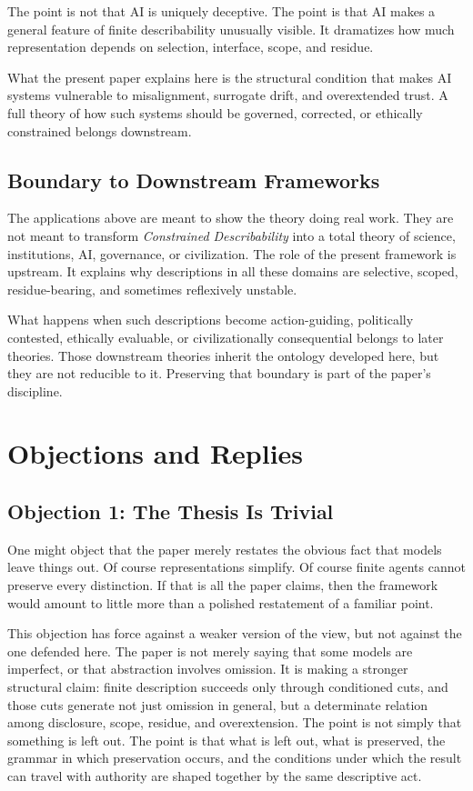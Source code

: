 \documentclass[11pt]{article}
\renewcommand{\emph}[1]{\textit{#1}}
\begin{document}
The point is not that AI is uniquely deceptive. The point is that AI makes a general feature of finite describability unusually visible. It dramatizes how much representation depends on selection, interface, scope, and residue.

What the present paper explains here is the structural condition that makes AI systems vulnerable to misalignment, surrogate drift, and overextended trust. A full theory of how such systems should be governed, corrected, or ethically constrained belongs downstream.

\subsection{Boundary to Downstream Frameworks}

The applications above are meant to show the theory doing real work. They are not meant to transform \emph{Constrained Describability} into a total theory of science, institutions, AI, governance, or civilization. The role of the present framework is upstream. It explains why descriptions in all these domains are selective, scoped, residue-bearing, and sometimes reflexively unstable.

What happens when such descriptions become action-guiding, politically contested, ethically evaluable, or civilizationally consequential belongs to later theories. Those downstream theories inherit the ontology developed here, but they are not reducible to it. Preserving that boundary is part of the paper's discipline.

\section{Objections and Replies}

\subsection{Objection 1: The Thesis Is Trivial}

One might object that the paper merely restates the obvious fact that models leave things out. Of course representations simplify. Of course finite agents cannot preserve every distinction. If that is all the paper claims, then the framework would amount to little more than a polished restatement of a familiar point.

This objection has force against a weaker version of the view, but not against the one defended here. The paper is not merely saying that some models are imperfect, or that abstraction involves omission. It is making a stronger structural claim: finite description succeeds only through conditioned cuts, and those cuts generate not just omission in general, but a determinate relation among disclosure, scope, residue, and overextension. The point is not simply that something is left out. The point is that what is left out, what is preserved, the grammar in which preservation occurs, and the conditions under which the result can travel with authority are shaped together by the same descriptive act. \cite{frigg_hartmann_models_sep,frigg_nguyen_scientific_representation_sep}
\end{document}
